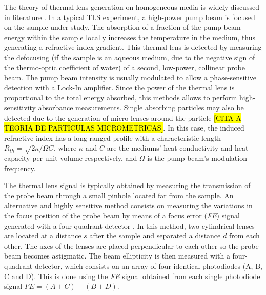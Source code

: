 \documentclass[9pt,twocolumn,twoside]{osajnl}
\newcommand{\FE}{\textit{FE}}
\begin{document}
The theory of thermal lens generation on homogeneous media is widely discussed in literature \cite{Bialkowski2019}. In a typical TLS experiment, a high-power pump beam is focused on the sample under study. The absorption of a fraction of the pump beam energy within the sample locally increases the temperature in the medium, thus generating a refractive index gradient. This thermal lens is detected by measuring the defocusing (if the sample is an aqueous medium, due to the negative sign of the thermo-optic coefficient of water) of a second, low-power, collinear probe beam. The pump beam intensity is usually modulated to allow a phase-sensitive detection with a Lock-In amplifier. Since the power of the thermal lens is proportional to the total energy absorbed, this methods allows to perform high-sensitivity absorbance measurements. Single absorbing particles may also be detected due to the generation of micro-lenses around the particle \cite{Selmke2018} \hl{[CITA A TEORIA DE PARTICULAS MICROMETRICAS]}. In this case, the induced refractive index has a long-ranged profile with a characteristic length $R_{th} = \sqrt{2 \kappa / \Omega C}$, where $\kappa$ and $C$ are the mediums' heat conductivity and heat-capacity per unit volume respectively, and $\Omega$ is the pump beam's modulation frequency.


The thermal lens signal is typically obtained by measuring the transmission of the probe beam through a small pinhole located far from the sample. An alternative and highly sensitive method consists on measuring the variations in the focus position of the probe beam by means of a focus error (\FE{}) signal generated with a four-quadrant detector \cite{Domene2017, ZaldivarEscola2019}. In this method, two cylindrical lenses are located at a distance $s$ after the sample and separated a distance $d$ from each other. The axes of the lenses are placed perpendicular to each other so the probe beam becomes astigmatic. The beam ellipticity is then measured with a four-quadrant detector, which consists on an array of four identical photodiodes (A, B, C and D). This is done using the \FE{} signal obtained from each single photodiode signal $\FE{} = (A+C)-(B+D)$.
\end{document}
